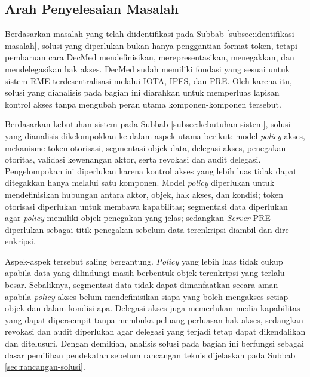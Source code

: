 \subsection{Arah Penyelesaian Masalah}
\label{subsec:arah-penyelesaian-masalah}

Berdasarkan masalah yang telah diidentifikasi pada Subbab \ref{subsec:identifikasi-masalah}, solusi yang diperlukan bukan hanya penggantian format token, tetapi pembaruan cara DecMed mendefinisikan, merepresentasikan, menegakkan, dan mendelegasikan hak akses. DecMed sudah memiliki fondasi yang sesuai untuk sistem RME terdesentralisasi melalui IOTA, IPFS, dan PRE. Oleh karena itu, solusi yang dianalisis pada bagian ini diarahkan untuk memperluas lapisan kontrol akses tanpa mengubah peran utama komponen-komponen tersebut.

Berdasarkan kebutuhan sistem pada Subbab \ref{subsec:kebutuhan-sistem}, solusi yang dianalisis dikelompokkan ke dalam aspek utama berikut: model \textit{policy} akses, mekanisme token otorisasi, segmentasi objek data, delegasi akses, penegakan otoritas, validasi kewenangan aktor, serta revokasi dan audit delegasi. Pengelompokan ini diperlukan karena kontrol akses yang lebih luas tidak dapat ditegakkan hanya melalui satu komponen. Model \textit{policy} diperlukan untuk mendefinisikan hubungan antara aktor, objek, hak akses, dan kondisi; token otorisasi diperlukan untuk membawa kapabilitas; segmentasi data diperlukan agar \textit{policy} memiliki objek penegakan yang jelas; sedangkan \textit{Server} PRE diperlukan sebagai titik penegakan sebelum data terenkripsi diambil dan dire-enkripsi.

Aspek-aspek tersebut saling bergantung. \textit{Policy} yang lebih luas tidak cukup apabila data yang dilindungi masih berbentuk objek terenkripsi yang terlalu besar. Sebaliknya, segmentasi data tidak dapat dimanfaatkan secara aman apabila \textit{policy} akses belum mendefinisikan siapa yang boleh mengakses setiap objek dan dalam kondisi apa. Delegasi akses juga memerlukan media kapabilitas yang dapat dipersempit tanpa membuka peluang perluasan hak akses, sedangkan revokasi dan audit diperlukan agar delegasi yang terjadi tetap dapat dikendalikan dan ditelusuri. Dengan demikian, analisis solusi pada bagian ini berfungsi sebagai dasar pemilihan pendekatan sebelum rancangan teknis dijelaskan pada Subbab \ref{sec:rancangan-solusi}.
